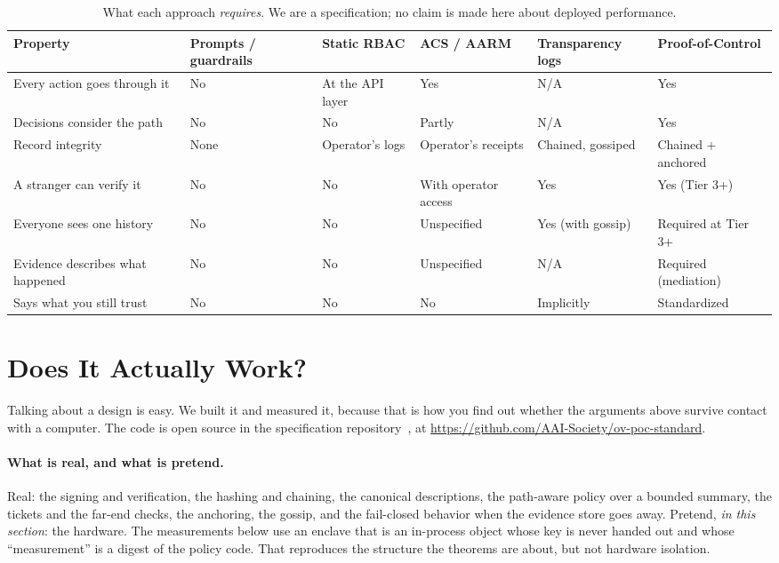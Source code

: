 \documentclass[11pt]{article}
\newcommand{\poc}{Proof-of-Control}
\begin{document}
\begin{table}[ht]
\centering\footnotesize
\begin{tabular}{@{}p{2.35cm}p{2.2cm}p{2.2cm}p{2.4cm}p{2.4cm}p{2.4cm}@{}}
\toprule
\textbf{Property} & \textbf{Prompts / guardrails} & \textbf{Static RBAC} & %
\textbf{ACS / AARM} & \textbf{Transparency logs} & \textbf{\poc{}} \\
\midrule
Every action goes through it & No & At the API layer & Yes & N/A & Yes \\
Decisions consider the path & No & No & Partly & N/A & Yes \\
Record integrity & None & Operator's logs & Operator's receipts &
Chained, gossiped & Chained + anchored \\
A stranger can verify it & No & No & With operator access & Yes &
Yes (Tier 3+) \\
Everyone sees one history & No & No & Unspecified & Yes (with gossip) &
Required at Tier 3+ \\
Evidence describes what happened & No & No & Unspecified & N/A &
Required (mediation) \\
Says what you still trust & No & No & No & Implicitly & Standardized \\
\bottomrule
\end{tabular}
\caption{What each approach \emph{requires}. We are a specification; no claim
is made here about deployed performance.}
\label{tab:compare}
\end{table}

\section{Does It Actually Work?}
\label{sec:eval}

Talking about a design is easy. We built it and measured it, because that is
how you find out whether the arguments above survive contact with a
computer. The code is open source in the specification
repository~\cite{pocspec}, at \url{https://github.com/AAI-Society/ov-poc-standard}.

\paragraph{What is real, and what is pretend.} Real: the signing and
verification, the hashing and chaining, the canonical descriptions, the
path-aware policy over a bounded summary, the tickets and the far-end checks,
the anchoring, the gossip, and the fail-closed behavior when the evidence
store goes away. Pretend, \emph{in this section}: the hardware. The
measurements below use an enclave that is an in-process object whose key is
never handed out and whose ``measurement'' is a digest of the policy code. That
reproduces the structure the theorems are about, but not hardware isolation.
\end{document}
